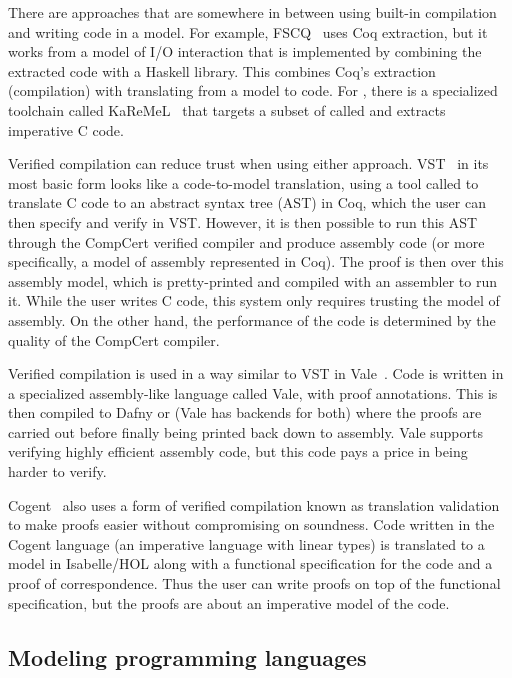 There are approaches that are somewhere in between using built-in compilation
and writing code in a model. For example, FSCQ~\cite{chen:fscq} uses Coq
extraction, but it works from a model of I/O interaction that is implemented by
combining the extracted code with a Haskell library. This combines Coq's
extraction (compilation) with translating from a model to code. For \fstar,
there is a specialized toolchain called KaReMeL~\cite{protzenko:lowstar} that
targets a subset of \fstar called \lowstar and extracts imperative C code.

Verified compilation can reduce trust when using either approach.
VST~\cite{cao:vst-floyd} in its most basic form looks like a code-to-model
translation, using a tool called  to translate C code to an
abstract syntax tree (AST) in Coq, which the user can then specify and verify in
VST. However, it is then possible to run this AST through the CompCert verified
compiler and produce assembly code (or more specifically, a model of assembly
represented in Coq). The proof is then over this assembly model, which is
pretty-printed and compiled with an assembler to run it. While the user writes C
code, this system only requires trusting the model of assembly. On the other
hand, the performance of the code is determined by the quality of the CompCert compiler.

Verified compilation is used in a way similar to VST in
Vale~\cite{bond:vale,fromherz:vale-fstar}. Code is written in a specialized
assembly-like language called Vale, with proof annotations. This is then
compiled to Dafny or \fstar (Vale has backends for both) where the proofs are carried
out before finally being printed back down to assembly. Vale supports verifying highly
efficient assembly code, but this code pays a price in being harder to verify.

Cogent~\cite{amani:cogent,oconnor:cogent-lang} also uses a form of verified
compilation known as translation validation to make proofs easier without compromising on soundness. Code
written in the Cogent language (an imperative language with linear types) is
translated to a model in Isabelle/HOL along with a functional specification for
the code and a proof of correspondence. Thus the user can write proofs on top of
the functional specification, but the proofs are about an imperative model of
the code.

\subsection{Modeling programming languages}

